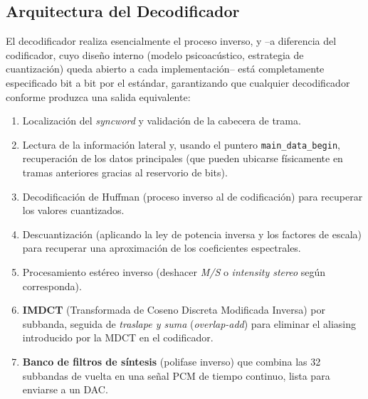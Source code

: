 \documentclass[pdflatex,sn-mathphys-num]{sn-jnl}%
\begin{document}
\subsection{Arquitectura del Decodificador}\label{sec:decoder}
El decodificador realiza esencialmente el proceso inverso, y --a diferencia del codificador, cuyo diseño interno (modelo psicoacústico, estrategia de cuantización) queda abierto a cada implementación-- está completamente especificado bit a bit por el estándar, garantizando que cualquier decodificador conforme produzca una salida equivalente:

\begin{enumerate}
    \item Localización del \textit{syncword} y validación de la cabecera de trama.
    \item Lectura de la información lateral y, usando el puntero \texttt{main\_data\_begin}, recuperación de los datos principales (que pueden ubicarse física\-mente en tramas anteriores gracias al reservorio de bits).
    \item Decodificación de Huffman (proceso inverso al de codificación) para recuperar los valores cuantizados.
    \item Descuantización (aplicando la ley de potencia inversa y los factores de escala) para recuperar una aproximación de los coeficientes espectrales.
    \item Procesamiento estéreo inverso (deshacer \textit{M/S} o \textit{intensity stereo} según corresponda).
    \item \textbf{IMDCT} (Transformada de Coseno Discreta Modificada Inversa) por subbanda, seguida de \textit{traslape y suma} (\textit{overlap-add}) para eliminar el aliasing introducido por la MDCT en el codificador.
    \item \textbf{Banco de filtros de síntesis} (polifase inverso) que combina las 32 subbandas de vuelta en una señal PCM de tiempo continuo, lista para enviarse a un DAC.
\end{enumerate}

\end{document}
